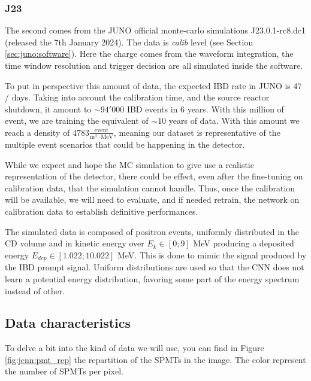 \documentclass[../main.tex]{subfiles}
\begin{document}
\subsubsection{J23}

The second comes from the JUNO official monte-carlo simulations J23.0.1-rc8.dc1 (released the 7th January 2024). The data is \textit{calib} level (see Section \ref{sec:juno:software}). Here the charge comes from the waveform integration, the time window resolution and trigger decision are all simulated inside the software.

To put in perspective this amount of data, the expected IBD rate in JUNO is 47 / days. Taking into account the calibration time, and the source reactor shutdown, it amount to $\sim 94'000$ IBD events in 6 years. With this million of event, we are training the equivalent of $\sim 10$ years of data. With this amount we reach a density of $4783 \frac{\mathrm{event}}{\mathrm{m}^3\cdot\mathrm{MeV}}$, meaning our dataset is representative of the multiple event scenarios that could be happening in the detector.

While we expect and hope the MC simulation to give use a realistic representation of the detector, there could be effect, even after the fine-tuning on calibration data, that the simulation cannot handle. Thus, once the calibration will be available, we will need to evaluate, and if needed retrain, the network on calibration data to establish definitive performances.

The simulated data is composed of positron events, uniformly distributed in the CD volume and in kinetic energy over $E_k \in [0; 9]$ MeV producing a deposited energy $E_{dep} \in [1.022; 10.022]$ MeV. This is done to mimic the signal produced by the IBD prompt signal. Uniform distributions are used so that the CNN does not learn a potential energy distribution, favoring some part of the energy spectrum instead of other.

\subsection{Data characteristics}

To delve a bit into the kind of data we will use, you can find in Figure \ref{fig:jcnn:pmt_rep} the repartition of the SPMTs in the image. The color represent the number of SPMTs per pixel.
\end{document}
